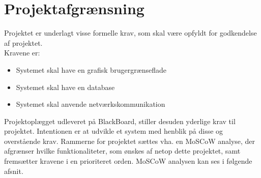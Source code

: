 \chapter{Projektafgrænsning}\label{ch:projektafgraensning}
Projektet er underlagt visse formelle krav, som skal være opfyldt for godkendelse af projektet. \\
Kravene er:
\begin{itemize}[noitemsep]
	\item Systemet skal have en grafisk brugergrænseflade
	\item Systemet skal have en database
	\item Systemet skal anvende netværkskommunikation
\end{itemize}

Projektoplægget udleveret på BlackBoard, stiller desuden yderlige krav til projektet. Intentionen er at udvikle et system med henblik på disse og overstående krav. Rammerne for projektet sættes vha. en MoSCoW analyse, der afgrænser hvilke funktionaliteter, som ønskes af netop dette projektet, samt fremsætter kravene i en prioriteret orden. MoSCoW analysen kan ses i følgende afsnit.
%
